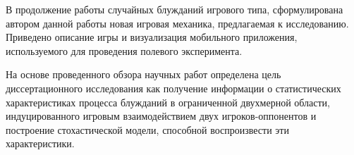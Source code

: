 В продолжение работы случайных блужданий игрового типа, сформулирована автором данной работы новая игровая механика, предлагаемая к исследованию. Приведено описание игры и визуализация мобильного приложения, используемого для проведения полевого эксперимента.

На основе проведенного обзора научных работ определена цель диссертационного исследования как получение информации о статистических характеристиках процесса блужданий в ограниченной двухмерной области, индуцированного игровым взаимодействием двух игроков-оппонентов и построение стохастической модели, способной воспроизвести эти характеристики.
